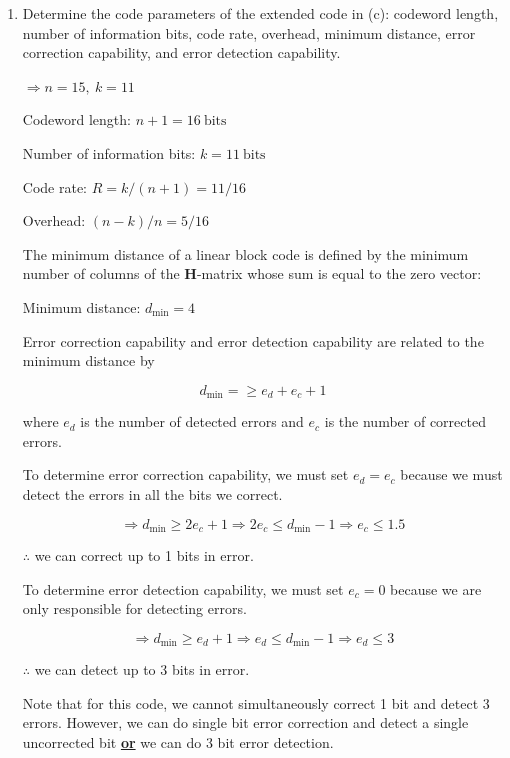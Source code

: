 \documentclass[fleqn]{article}
\begin{document}
\begin{enumerate}
\begin{enumerate}
			\item Determine the code parameters of the extended code in (c): codeword length, number of information bits, code rate, overhead, minimum distance, error correction capability, and error detection capability.
			
			$\Rightarrow n = 15,\ k = 11$
						
			Codeword length: $n + 1 = 16\ \text{bits}$
			
			Number of information bits: $k = 11\ \text{bits}$
			
			Code rate: $R = k/(n+1) = 11/16$
			
			Overhead: $(n - k)/n = 5/16$
			
			The minimum distance of a linear block code is defined by the minimum number of columns of the $\mathbf{H}$-matrix whose sum is equal to the zero vector:
			
			Minimum distance: $d_\text{min} = 4$
			
			Error correction capability and error detection capability are related to the minimum distance by
			
			\begin{equation*}
				d_{\text{min}} = \geq e_d + e_c + 1
			\end{equation*}
			
			where $e_d$ is the number of detected errors and $e_c$ is the number of corrected errors.
			
			To determine error correction capability, we must set $e_d = e_c$ because we must detect the errors in all the bits we correct.
			
			\begin{equation*}
				\Rightarrow d_{\text{min}} \geq 2e_c + 1 \Rightarrow 2e_c \leq d_{\text{min}} - 1 \Rightarrow e_c \leq 1.5
			\end{equation*}
			
			$\therefore$ we can correct up to 1 bits in error.
			
			To determine error detection capability, we must set $e_c = 0$ because we are only responsible for detecting errors.
			
			\begin{equation*}
				\Rightarrow d_{\text{min}} \geq e_d + 1 \Rightarrow e_d \leq d_{\text{min}} - 1 \Rightarrow e_d \leq 3
			\end{equation*}
			
			$\therefore$ we can detect up to 3 bits in error.
			
			Note that for this code, we cannot simultaneously correct 1 bit and detect 3 errors. However, we can do single bit error correction and detect a single uncorrected bit \textbf{\underline{or}} we can do 3 bit error detection.
		\end{enumerate}
		

\end{enumerate}
\end{document}

